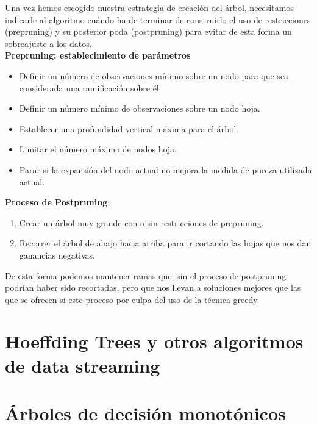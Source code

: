 Una vez hemos escogido nuestra estrategia de creación del árbol, necesitamos indicarle al algoritmo cuándo ha de terminar de construirlo el uso de restricciones (prepruning) y su posterior poda (postpruning) para evitar de esta forma un sobreajuste a los datos.\\

\textbf{Prepruning: establecimiento de parámetros}
\begin{itemize}
	\item Definir un número de observaciones mínimo sobre un nodo para que sea considerada una ramificación sobre él.
	\item Definir un número mínimo de observaciones sobre un nodo hoja.
	\item Establecer una profundidad vertical máxima para el árbol.
	\item Limitar el número máximo de nodos hoja.
	\item Parar si la expansión del nodo actual no mejora la medida de pureza utilizada actual.
\end{itemize}

\textbf{Proceso de Postpruning}:
\begin{enumerate}
	\item Crear un árbol muy grande con o sin restricciones de prepruning.
	\item Recorrer el árbol de abajo hacia arriba para ir cortando las hojas que nos dan ganancias negativas.
\end{enumerate}

De esta forma podemos mantener ramas que, sin el proceso de postpruning podrían haber sido recortadas, pero que nos llevan a soluciones mejores que las que se ofrecen si este proceso por culpa del uso de la técnica greedy.


\section{Hoeffding Trees y otros algoritmos de data streaming}

\section{Árboles de decisión monotónicos}


\newpage


